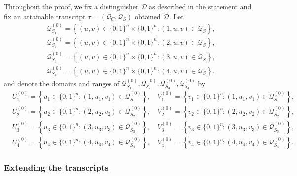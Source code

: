 Throughout the proof, we fix a distinguisher $\mathcal{D}$ as described in the statement and fix an attainable transcript $\tau =\left(\mathcal{Q}_{C}, \mathcal{Q}_{S}\right)$ obtained $\mathcal{D}$. Let
%
$$
\begin{aligned}
&\mathcal{Q}_{S_{1}}^{(0)}=\left\{(u, v) \in\{0,1\}^{n} \times\{0,1\}^{n}:(1, u, v) \in \mathcal{Q}_{S} \right\},\\
&\mathcal{Q}_{S_{2}}^{(0)}=\left\{(u, v) \in\{0,1\}^{n} \times\{0,1\}^{n}:(2, u, v) \in \mathcal{Q}_{S} \right\},\\
&\mathcal{Q}_{S_{3}}^{(0)}=\left\{(u, v) \in\{0,1\}^{n} \times\{0,1\}^{n}:(3, u, v) \in \mathcal{Q}_{S} \right\},\\
&\mathcal{Q}_{S_{4}}^{(0)}=\left\{(u, v) \in\{0,1\}^{n} \times\{0,1\}^{n}:(4, u, v) \in \mathcal{Q}_{S} \right\}.
\end{aligned}
$$
%
and denote the domains and ranges of $\mathcal{Q}_{S_{1}}^{(0)}, \mathcal{Q}_{S_{2}}^{(0)}, \mathcal{Q}_{S_{3}}^{(0)}, \mathcal{Q}_{S_{4}}^{(0)}$ by        {\small
	\begin{align*}
	&U_{1}^{(0)}=\left\{u_{1} \in\{0,1\}^{n}:\left(1, u_{1}, v_{1}\right) \in \mathcal{Q}_{S_{1}}^{(0)}\right\}, \quad V_{1}^{(0)}=\left\{v_{1} \in\{0,1\}^{n}:\left(1, u_{1}, v_{1}\right) \in \mathcal{Q}_{S_{1}}^{(0)}\right\},\\
	&U_{2}^{(0)}=\left\{u_{2} \in\{0,1\}^{n}:\left(2, u_{2}, v_{2}\right) \in \mathcal{Q}_{S_{2}}^{(0)}\right\}, \quad V_{2}^{(0)}=\left\{v_{2} \in\{0,1\}^{n}:\left(2, u_{2}, v_{2}\right) \in \mathcal{Q}_{S_{2}}^{(0)}\right\},\\
	&U_{3}^{(0)}=\left\{u_{3} \in\{0,1\}^{n}:\left(3, u_{3}, v_{3}\right) \in \mathcal{Q}_{S_{3}}^{(0)}\right\}, \quad V_{3}^{(0)}=\left\{v_{3} \in\{0,1\}^{n}:\left(3, u_{3}, v_{3}\right) \in \mathcal{Q}_{S_{3}}^{(0)}\right\},\\
	&U_{4}^{(0)}=\left\{u_{4} \in\{0,1\}^{n}:\left(4, u_{4}, v_{4}\right) \in \mathcal{Q}_{S_{4}}^{(0)}\right\}, \quad V_{4}^{(0)}=\left\{v_{4} \in\{0,1\}^{n}:\left(4, u_{4}, v_{4}\right) \in \mathcal{Q}_{S_{4}}^{(0)}\right\}.
	\end{align*}
}%
%



\subsubsection{Extending the transcripts}

